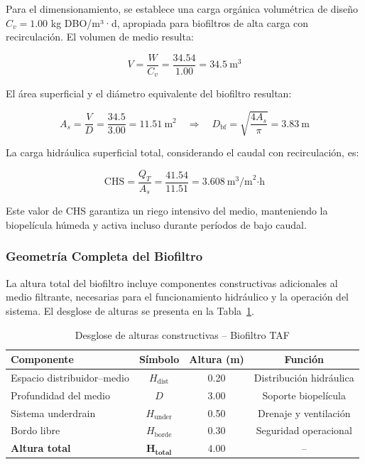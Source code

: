 \documentclass[12pt,a4paper]{article}
\begin{document}
Para el dimensionamiento, se establece una carga orgánica volumétrica de diseño $C_v = 1.00$ kg DBO/m³·d, apropiada para biofiltros de alta carga con recirculación. El volumen de medio resulta:

\begin{equation}
V = \frac{W}{C_v} = \frac{34.54}{1.00} = 34.5\ \text{m}^3
\end{equation}

El área superficial y el diámetro equivalente del biofiltro resultan:

\begin{equation}
A_s = \frac{V}{D} = \frac{34.5}{3.00} = 11.51\ \text{m}^2 \quad \Rightarrow \quad D_{\text{bf}} = \sqrt{\frac{4A_s}{\pi}} = 3.83\ \text{m}
\end{equation}

La carga hidráulica superficial total, considerando el caudal con recirculación, es:

\begin{equation}
\text{CHS} = \frac{Q_T}{A_s} = \frac{41.54}{11.51} = 3.608\ \text{m}^3\text{/m}^2\text{·h}
\end{equation}

Este valor de CHS garantiza un riego intensivo del medio, manteniendo la biopelícula húmeda y activa incluso durante períodos de bajo caudal.

\subsubsection*{Geometría Completa del Biofiltro}

La altura total del biofiltro incluye componentes constructivas adicionales al medio filtrante, necesarias para el funcionamiento hidráulico y la operación del sistema. El desglose de alturas se presenta en la Tabla~\ref{tab:alturas_taf}.

\begin{table}[H]
\centering
\caption{Desglose de alturas constructivas -- Biofiltro TAF}
\label{tab:alturas_taf}
\begin{tabular}{lccc}
\toprule
\textbf{Componente} & \textbf{Símbolo} & \textbf{Altura (m)} & \textbf{Función} \\
\midrule
Espacio distribuidor--medio & $H_{\text{dist}}$ & 0.20 & Distribución hidráulica \\
Profundidad del medio & $D$ & 3.00 & Soporte biopelícula \\
Sistema underdrain & $H_{\text{under}}$ & 0.50 & Drenaje y ventilación \\
Bordo libre & $H_{\text{borde}}$ & 0.30 & Seguridad operacional \\
\midrule
\textbf{Altura total} & $\mathbf{H_{\text{total}}}$ & $\mathbf{4.00}$ & -- \\
\bottomrule
\end{tabular}
\end{table}
\end{document}
